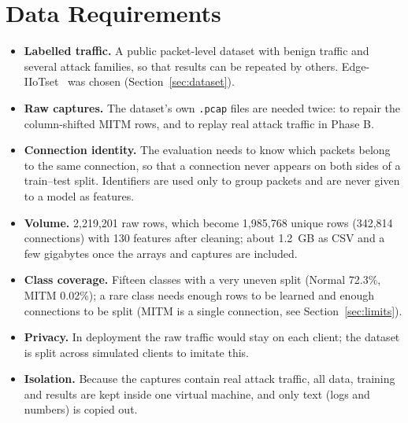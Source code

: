 \section{Data Requirements}
\begin{itemize}
  \item \textbf{Labelled traffic.} A public packet-level dataset with benign traffic and several attack families, so that results can be repeated by others. Edge-IIoTset~\cite{ferrag2022edge} was chosen (Section~\ref{sec:dataset}).
  \item \textbf{Raw captures.} The dataset's own \texttt{.pcap} files are needed twice: to repair the column-shifted MITM rows, and to replay real attack traffic in Phase B.
  \item \textbf{Connection identity.} The evaluation needs to know which packets belong to the same connection, so that a connection never appears on both sides of a train--test split. Identifiers are used only to group packets and are never given to a model as features.
  \item \textbf{Volume.} 2{,}219{,}201 raw rows, which become 1{,}985{,}768 unique rows (342{,}814 connections) with 130 features after cleaning; about 1.2~GB as CSV and a few gigabytes once the arrays and captures are included.
  \item \textbf{Class coverage.} Fifteen classes with a very uneven split (Normal 72.3\%, MITM 0.02\%); a rare class needs enough rows to be learned and enough connections to be split (MITM is a single connection, see Section~\ref{sec:limits}).
  \item \textbf{Privacy.} In deployment the raw traffic would stay on each client; the dataset is split across simulated clients to imitate this.
  \item \textbf{Isolation.} Because the captures contain real attack traffic, all data, training and results are kept inside one virtual machine, and only text (logs and numbers) is copied out.
\end{itemize}


